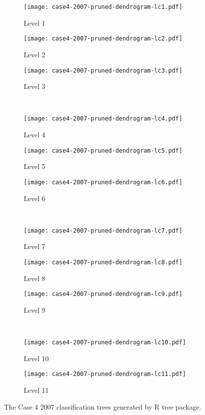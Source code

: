 \begin{appendices}

\begin{figure}[!ht] \centering
	\captionsetup[subfigure]{width=2.0in}
	\begin{subfigure}[t]{0.32\textwidth}
		\texttt{[image: case4-2007-pruned-dendrogram-lc1.pdf]}
		\caption{Level 1}
	\end{subfigure}
	\begin{subfigure}[t]{0.32\textwidth}
		\texttt{[image: case4-2007-pruned-dendrogram-lc2.pdf]}
		\caption{Level 2}
	\end{subfigure}
	\begin{subfigure}[t]{0.32\textwidth}
		\texttt{[image: case4-2007-pruned-dendrogram-lc3.pdf]}
		\caption{Level 3}
	\end{subfigure}\\
	\vspace{5pt}
	\begin{subfigure}[t]{0.32\textwidth}
		\texttt{[image: case4-2007-pruned-dendrogram-lc4.pdf]}
		\caption{Level 4}
	\end{subfigure}
	\begin{subfigure}[t]{0.32\textwidth}
		\texttt{[image: case4-2007-pruned-dendrogram-lc5.pdf]}
		\caption{Level 5}
	\end{subfigure}
	\begin{subfigure}[t]{0.32\textwidth}
		\texttt{[image: case4-2007-pruned-dendrogram-lc6.pdf]}
		\caption{Level 6}
	\end{subfigure}\\
	\vspace{5pt}	
	\begin{subfigure}[t]{0.32\textwidth}
		\texttt{[image: case4-2007-pruned-dendrogram-lc7.pdf]}
		\caption{Level 7}
	\end{subfigure}
	\begin{subfigure}[t]{0.32\textwidth}
		\texttt{[image: case4-2007-pruned-dendrogram-lc8.pdf]}
		\caption{Level 8}
	\end{subfigure}
	\begin{subfigure}[t]{0.32\textwidth}
		\texttt{[image: case4-2007-pruned-dendrogram-lc9.pdf]}
		\caption{Level 9}
	\end{subfigure}\\
	\vspace{5pt}
	\begin{subfigure}[t]{0.32\textwidth}
		\texttt{[image: case4-2007-pruned-dendrogram-lc10.pdf]}
		\caption{Level 10}
	\end{subfigure}
	\begin{subfigure}[t]{0.32\textwidth}
		\texttt{[image: case4-2007-pruned-dendrogram-lc11.pdf]}
		\caption{Level 11}
	\end{subfigure}
	\vspace{5pt}
	\caption[The Case 4 2007 classification trees generated by R tree package.]{The Case 4 2007 classification trees generated by R tree package.}
	\label{fig: appendix-fig.c25.tree}
\end{figure}


\end{appendices}
